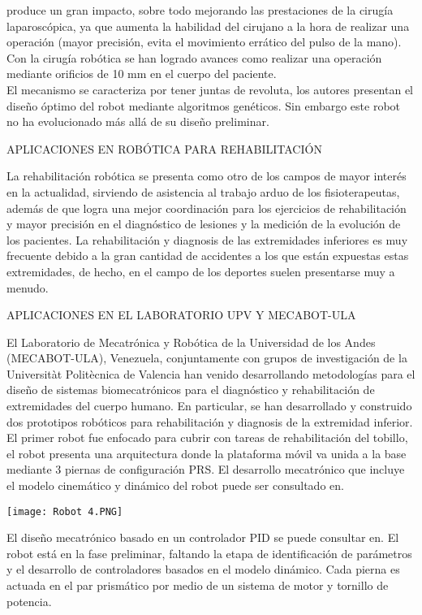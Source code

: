 \documentclass[12pt,letterpaper]{report}
\begin{document}
\begin{flushleft}
\begin{flushleft}
\begin{center}
\begin{flushleft}
\begin{center}
\begin{flushleft}
\begin{center}
\begin{flushleft}
\begin{center}
\begin{flushleft}
produce un gran impacto, sobre todo mejorando las prestaciones de la cirugía laparoscópica, ya que aumenta la habilidad del cirujano a la hora de realizar una operación (mayor precisión, evita el movimiento errático del pulso de la mano).  Con la cirugía robótica se han logrado avances como realizar una operación mediante orificios de 10 mm en el cuerpo del paciente.\\
El mecanismo se caracteriza por tener juntas de revoluta, los autores presentan el diseño óptimo del robot mediante algoritmos genéticos. Sin embargo este robot no ha evolucionado más allá de su diseño preliminar.
\begin{center}
APLICACIONES EN ROBÓTICA PARA REHABILITACIÓN
\begin{flushleft}
La rehabilitación robótica se presenta como otro de los campos de  mayor interés en la actualidad, sirviendo de asistencia al trabajo arduo  de los fisioterapeutas, además de que logra una mejor coordinación para  los ejercicios de rehabilitación y mayor precisión en el diagnóstico de  lesiones y la medición de la evolución de los pacientes. La rehabilitación y diagnosis de las extremidades inferiores es muy frecuente debido a la  gran cantidad de accidentes a los que están expuestas estas extremidades,  de hecho, en el campo de los deportes suelen presentarse muy a menudo. 
\begin{center}
APLICACIONES EN EL LABORATORIO UPV Y MECABOT-ULA
\begin{flushleft}
El Laboratorio de Mecatrónica y Robótica de la Universidad de los Andes (MECABOT-ULA),  Venezuela, conjuntamente con grupos de investigación de la Universitàt Politècnica de Valencia han venido desarrollando metodologías para el diseño de sistemas biomecatrónicos para el diagnóstico y rehabilitación de extremidades del cuerpo humano. En particular, se han desarrollado y construido 
dos prototipos robóticos para rehabilitación y diagnosis de la extremidad inferior.  El primer robot fue enfocado para cubrir con tareas de rehabilitación del tobillo, el robot presenta una arquitectura donde la plataforma móvil va unida a la base mediante 3 piernas de configuración PRS. El desarrollo mecatrónico que incluye el modelo cinemático y dinámico del robot puede ser consultado en.
\begin{flushleft}
 \texttt{[image: Robot 4.PNG]}
 \begin{flushleft}
  El diseño mecatrónico basado en un controlador PID se puede consultar en. El robot está en la fase preliminar, faltando la etapa de identificación de parámetros y el desarrollo de controladores basados en el modelo dinámico. Cada pierna es actuada en el par prismático por medio de un sistema de motor y tornillo de potencia.

\end{flushleft}
\end{flushleft}
\end{flushleft}
\end{center}
\end{flushleft}
\end{center}
\end{flushleft}
\end{center}
\end{flushleft}
\end{center}
\end{flushleft}
\end{center}
\end{flushleft}
\end{center}
\end{flushleft}
\end{flushleft}
\end{document}
